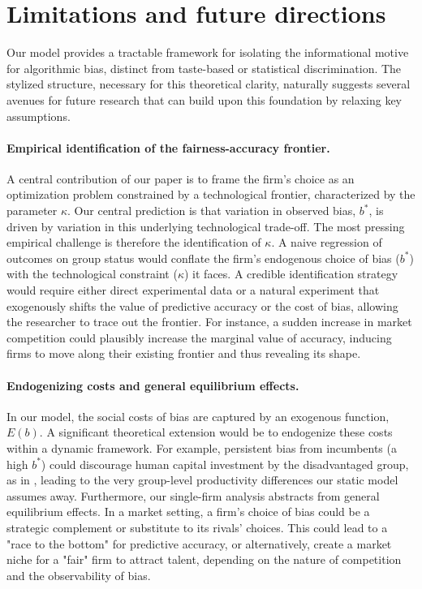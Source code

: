 \section{Limitations and future directions}

Our model provides a tractable framework for isolating the informational motive for algorithmic bias, distinct from taste-based or statistical discrimination. The stylized structure, necessary for this theoretical clarity, naturally suggests several avenues for future research that can build upon this foundation by relaxing key assumptions.

\paragraph{Empirical identification of the fairness-accuracy frontier.}
A central contribution of our paper is to frame the firm's choice as an optimization problem constrained by a technological frontier, characterized by the parameter $\kappa$. Our central prediction is that variation in observed bias, $b^*$, is driven by variation in this underlying technological trade-off. The most pressing empirical challenge is therefore the identification of $\kappa$. A naive regression of outcomes on group status would conflate the firm's endogenous choice of bias ($b^*$) with the technological constraint ($\kappa$) it faces. A credible identification strategy would require either direct experimental data or a natural experiment that exogenously shifts the value of predictive accuracy or the cost of bias, allowing the researcher to trace out the frontier. For instance, a sudden increase in market competition could plausibly increase the marginal value of accuracy, inducing firms to move along their existing frontier and thus revealing its shape.

\paragraph{Endogenizing costs and general equilibrium effects.}
In our model, the social costs of bias are captured by an exogenous function, $E(b)$. A significant theoretical extension would be to endogenize these costs within a dynamic framework. For example, persistent bias from incumbents (a high $b^*$) could discourage human capital investment by the disadvantaged group, as in \citep{CoateLoury1993}, leading to the very group-level productivity differences our static model assumes away. Furthermore, our single-firm analysis abstracts from general equilibrium effects. In a market setting, a firm's choice of bias could be a strategic complement or substitute to its rivals' choices. This could lead to a "race to the bottom" for predictive accuracy, or alternatively, create a market niche for a "fair" firm to attract talent, depending on the nature of competition and the observability of bias.

